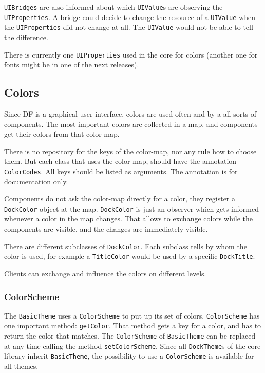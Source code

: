 \documentclass[a4paper,10pt]{article}
\newcommand{\src}[1]{\lstinline[basicstyle=\normalsize\ttfamily,keywordstyle=\normalsize\ttfamily,identifierstyle=\normalsize\ttfamily]|#1|}
\begin{document}
\src{UIBridges} are also informed about which \src{UIValue}s are observing the \\\src{UIProperties}. A bridge could decide to change the resource of a \src{UIValue} when the \src{UIProperties} did not change at all. The \src{UIValue} would not be able to tell the difference.

There is currently one \src{UIProperties} used in the core for colors (another one for fonts might be in one of the next releases).

\subsection{Colors}
Since DF is a graphical user interface, colors are used often and by a all sorts of components. The most important colors are collected in a map, and components get their colors from that color-map.

There is no repository for the keys of the color-map, nor any rule how to choose them. But each class that uses the color-map, should have the annotation \src{ColorCodes}. All keys should be listed as arguments. The annotation is for documentation only.

Components do not ask the color-map directly for a color, they register a \src{DockColor}-object at the map. \src{DockColor} is just an observer which gets informed whenever a color in the map changes. That allows to exchange colors while the components are visible, and the changes are immediately visible.

There are different subclasses of \src{DockColor}. Each subclass tells by whom the color is used, for example a \src{TitleColor} would be used by a specific \src{DockTitle}.

Clients can exchange and influence the colors on different levels.

\subsubsection{ColorScheme}
The \src{BasicTheme} uses a \src{ColorScheme} to put up its set of colors. \src{ColorScheme} has one important method: \src{getColor}. That method gets a key for a color, and has to return the color that matches. The \src{ColorScheme} of \src{BasicTheme} can be replaced at any time calling the method \src{setColorScheme}. Since all \src{DockTheme}s of the core library inherit \src{BasicTheme}, the possibility to use a \src{ColorScheme} is available for all themes.
\end{document}
